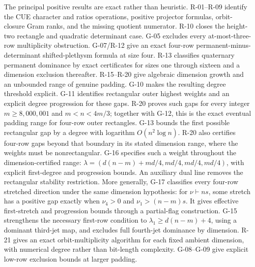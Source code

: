 \documentclass[11pt,a4paper]{article}
\theoremstyle{definition}\newtheorem{definition}{Definition}
\begin{document}
The principal positive results are exact rather than heuristic. R-01--R-09 identify the CUE character and ratios operations, positive projector formulas, orbit-closure Gram ranks, and the missing quotient numerator. R-10 closes the height-two rectangle and quadratic determinant case. G-05 excludes every at-most-three-row multiplicity obstruction. G-07/R-12 give an exact four-row permanent-minus-determinant shifted-plethysm formula at size four. R-13 classifies quaternary permanent dominance by exact certificates for sizes one through sixteen and a dimension exclusion thereafter. R-15--R-20 give algebraic dimension growth and an unbounded range of genuine padding. G-10 makes the resulting degree threshold explicit. G-11 identifies rectangular outer highest weights and an explicit degree progression for these gaps. R-20 proves such gaps for every integer $m\geq8{,}000{,}001$ and $m<n<4m/3$; together with G-12, this is the exact eventual padding range for four-row outer rectangles. G-13 bounds the first possible rectangular gap by a degree with logarithm $O(n^2\log n)$. R-20 also certifies four-row gaps beyond that boundary in its stated dimension range, where the weights must be nonrectangular. G-16 specifies such a weight throughout the dimension-certified range: $\lambda=(d(n-m)+md/4,md/4,md/4,md/4)$, with explicit first-degree and progression bounds. An auxiliary dual line removes the rectangular stability restriction. More generally, G-17 classifies every four-row stretched direction under the same dimension hypothesis: for $\nu\vdash ns$, some stretch has a positive gap exactly when $\nu_4>0$ and $\nu_1>(n-m)s$. It gives effective first-stretch and progression bounds through a partial-flag construction. G-15 strengthens the necessary first-row condition to $\lambda_1\geq d(n-m)+4$, using a dominant third-jet map, and excludes full fourth-jet dominance by dimension. R-21 gives an exact orbit-multiplicity algorithm for each fixed ambient dimension, with numerical degree rather than bit-length complexity. G-08--G-09 give explicit low-row exclusion bounds at larger padding.
\end{document}
